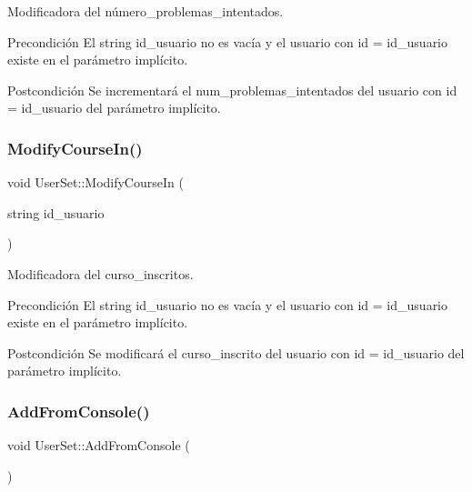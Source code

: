 Modificadora del número\+\_\+problemas\+\_\+intentados. 

\begin{DoxyPrecond}{Precondición}
El string id\+\_\+usuario no es vacía y el usuario con id = id\+\_\+usuario existe en el parámetro implícito. 
\end{DoxyPrecond}
\begin{DoxyPostcond}{Postcondición}
Se incrementará el num\+\_\+problemas\+\_\+intentados del usuario con id = id\+\_\+usuario del parámetro implícito. 
\end{DoxyPostcond}
\mbox{\label{class_user_set_af618063be593ccc2c3605a7d75773437}} 
\subsubsection{\texorpdfstring{Modify\+Course\+In()}{ModifyCourseIn()}}
{\footnotesize\ttfamily void User\+Set\+::\+Modify\+Course\+In (\begin{DoxyParamCaption}\item[{string}]{id\+\_\+usuario }\end{DoxyParamCaption})}



Modificadora del curso\+\_\+inscritos. 

\begin{DoxyPrecond}{Precondición}
El string id\+\_\+usuario no es vacía y el usuario con id = id\+\_\+usuario existe en el parámetro implícito. 
\end{DoxyPrecond}
\begin{DoxyPostcond}{Postcondición}
Se modificará el curso\+\_\+inscrito del usuario con id = id\+\_\+usuario del parámetro implícito. 
\end{DoxyPostcond}
\mbox{\label{class_user_set_a4618efff11bc85371b754ee58e138ba4}} 
\subsubsection{\texorpdfstring{Add\+From\+Console()}{AddFromConsole()}}
{\footnotesize\ttfamily void User\+Set\+::\+Add\+From\+Console (\begin{DoxyParamCaption}{ }\end{DoxyParamCaption})}



